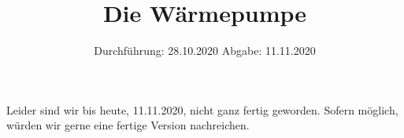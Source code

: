 

\subject{D206}
\title{Die Wärmepumpe}
\date{
    Durchführung: 28.10.2020
    \hspace{3em}
    Abgabe: 11.11.2020
}



\maketitle
\thispagestyle{empty}
\tableofcontents
\newpage

Leider sind wir bis heute, 11.11.2020, nicht ganz fertig geworden. Sofern möglich, würden wir gerne eine fertige Version nachreichen.
\newpage


\newpage


\newpage


\newpage


\newpage

\printbibliography


